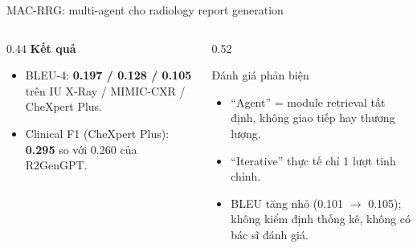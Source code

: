 \documentclass[aspectratio=169,10pt]{beamer}
\begin{document}
\begin{frame}{MAC-RRG: multi-agent cho radiology report generation}
  \centering
  \raggedright
  \begin{columns}[T]
    \begin{column}{0.44\textwidth}
      \textbf{Kết quả}
      \begin{itemize}
        \item BLEU-4: \textbf{0.197 / 0.128 / 0.105} trên IU X-Ray / MIMIC-CXR / CheXpert Plus.
        \item Clinical F1 (CheXpert Plus): \textbf{0.295} so với 0.260 của R2GenGPT.
      \end{itemize}
    \end{column}
    \begin{column}{0.52\textwidth}
      \begin{alertblock}{Đánh giá phản biện}
        \begin{itemize}
          \item “Agent” = module retrieval tất định, không giao tiếp hay thương lượng.
          \item “Iterative” thực tế chỉ 1 lượt tinh chỉnh.
          \item BLEU tăng nhỏ (0.101 $\to$ 0.105); không kiểm định thống kê, không có bác sĩ đánh giá.
        \end{itemize}
      \end{alertblock}
    \end{column}
  \end{columns}
\end{frame}
\end{document}
